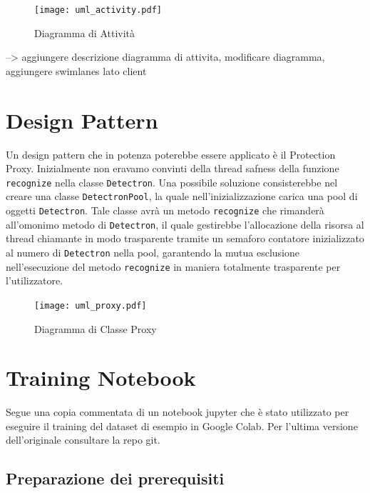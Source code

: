 \documentclass[12pt,a4paper]{article}
\begin{document}
\begin{figure}[p]
    \caption{Diagramma di Attività}
    \centering
    \texttt{[image: uml\_activity.pdf]}
\end{figure}

--> aggiungere descrizione diagramma di attivita, modificare diagramma,
aggiungere swimlanes lato client
\pagebreak

\section{Design Pattern}

Un design pattern che in potenza poterebbe essere applicato è il
Protection Proxy. Inizialmente non eravamo convinti della thread safness
della funzione \texttt{recognize} nella classe \texttt{Detectron}. Una
possibile soluzione consisterebbe nel creare una classe
\texttt{DetectronPool}, la quale nell'inizializzazione carica una pool
di oggetti \texttt{Detectron}. Tale classe avrà un metodo
\texttt{recognize} che rimanderà all'omonimo metodo di
\texttt{Detectron}, il quale gestirebbe l'allocazione della risorsa al
thread chiamante in modo trasparente tramite un semaforo contatore
inizializzato al numero di \texttt{Detectron} nella pool, garantendo la
mutua esclusione nell'esecuzione del metodo \texttt{recognize} in
maniera totalmente trasparente per l'utilizzatore.

\begin{figure}[h]
    \caption{Diagramma di Classe Proxy}
    \centering
    \texttt{[image: uml\_proxy.pdf]}
\end{figure}

\pagebreak

\section{Training Notebook} %

Segue una copia commentata di un notebook jupyter che è stato utilizzato
per eseguire il training del dataset di esempio in Google Colab. Per
l'ultima versione dell'originale consultare la repo git.

\subsection{Preparazione dei prerequisiti}
\end{document}
